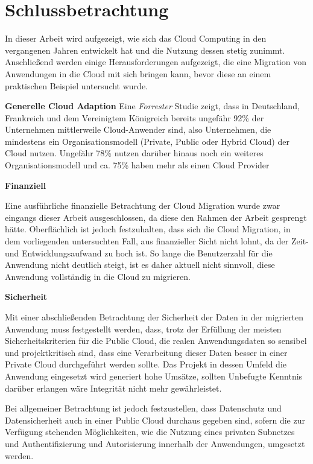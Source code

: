 \chapter{Schlussbetrachtung}
\label{chap:schlussbetrachtung}
In dieser Arbeit wird aufgezeigt, wie sich das Cloud Computing in den vergangenen Jahren entwickelt hat und die Nutzung dessen stetig zunimmt. Anschließend werden einige Herausforderungen aufgezeigt, die eine Migration von Anwendungen in die Cloud mit sich bringen kann, bevor diese an einem praktischen Beispiel untersucht wurde.

\textbf{Generelle Cloud Adaption}
Eine \textit{Forrester} Studie zeigt, dass in Deutschland, Frankreich und dem Vereinigtem Königreich bereits ungefähr 92\% der Unternehmen mittlerweile Cloud-Anwender sind, also Unternehmen, die mindestens ein Organisationsmodell (Private, Public oder Hybrid Cloud) der Cloud nutzen. Ungefähr 78\% nutzen darüber hinaus noch ein weiteres Organisationsmodell und ca. 75\% haben mehr als einen Cloud Provider \cite[Vgl.][S. 4]{Rajamani2022} 

\textbf{Finanziell}

Eine ausführliche finanzielle Betrachtung der Cloud Migration wurde zwar eingangs dieser Arbeit ausgeschlossen, da diese den Rahmen der Arbeit gesprengt hätte. Oberflächlich ist jedoch festzuhalten, dass sich die Cloud Migration, in dem vorliegenden untersuchten Fall, aus finanzieller Sicht nicht lohnt, da der Zeit- und Entwicklungsaufwand zu hoch ist. So lange die Benutzerzahl für die Anwendung nicht deutlich steigt, ist es daher aktuell nicht sinnvoll, diese Anwendung vollständig in die Cloud zu migrieren.

\textbf{Sicherheit}

Mit einer abschließenden Betrachtung der Sicherheit der Daten in der migrierten Anwendung muss festgestellt werden, dass, trotz der Erfüllung der meisten Sicherheitskriterien für die Public Cloud, die realen Anwendungsdaten so sensibel und projektkritisch sind, dass eine Verarbeitung dieser Daten besser in einer Private Cloud durchgeführt werden sollte. Das Projekt in dessen Umfeld die Anwendung eingesetzt wird generiert hohe Umsätze, sollten Unbefugte Kenntnis darüber erlangen wäre Integrität nicht mehr gewährleistet.

Bei allgemeiner Betrachtung ist jedoch festzustellen, dass Datenschutz und Datensicherheit auch in einer Public Cloud durchaus gegeben sind, sofern die zur Verfügung stehenden Möglichkeiten, wie die Nutzung eines privaten Subnetzes und Authentifizierung und Autorisierung innerhalb der Anwendungen, umgesetzt werden.
\pagebreak

